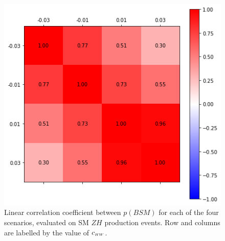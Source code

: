 \begin{figure}[h!]
\includegraphics[width=0.35\linewidth]{plots/bdt_corr.png}
\caption{\label{fig:bdt_corr}
  Linear correlation coefficient between $p(BSM)$ for
  each of the four scenarios, evaluated on SM $Z H$ production events.
  Row and columns are labelled by the value of $c_{\scriptscriptstyle HW}$.
}
\end{figure}


